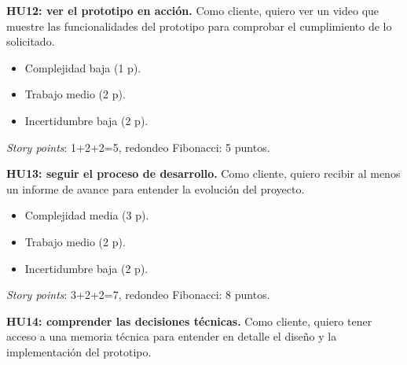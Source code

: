 \documentclass[
11pt, %
]{charter}
\begin{document}
	\textbf{HU12: ver el prototipo en acción.} Como cliente, quiero ver un video que muestre las funcionalidades del prototipo para comprobar el cumplimiento de lo solicitado.

	\begin{itemize}
		\item Complejidad baja (1 p).
		\item Trabajo medio (2 p). 
		\item Incertidumbre baja (2 p). 
	\end{itemize}
	\textit{Story points}: 1+2+2=5, redondeo Fibonacci: 5 puntos.
		
	\textbf{HU13: seguir el proceso de desarrollo.} Como cliente, quiero recibir al menos un informe de avance para entender la evolución del proyecto.

	\begin{itemize}
		\item Complejidad media (3 p).
		\item Trabajo medio (2 p). 
		\item Incertidumbre baja (2 p). 
	\end{itemize}
	\textit{Story points}: 3+2+2=7, redondeo Fibonacci: 8 puntos.
		
	\textbf{HU14: comprender las decisiones técnicas.} Como cliente, quiero tener acceso a una memoria técnica para entender en detalle el diseño y la implementación del prototipo.
\end{document}
